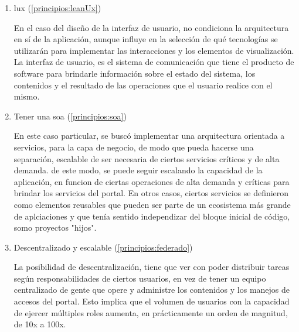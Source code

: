 \begin{enumerate}
    \begin{itemize}
        \item [Loadbalancer de F5]
        \item [Webserver: Apache]
        \item [Application server: Tomcat]
        \item [RDBMS: Oracle]
        \item [sistema operativo de servers: RH Linux]
    \end{itemize}
    
    \item \Gls{lux} (\ref{principios:leanUx})

    En el caso del diseño de la interfaz de usuario, no condiciona la arquitectura en sí de la aplicación, aunque influye en la selección de qué tecnologías se utilizarán para implementar las interacciones y los elementos de visualización. La interfaz de usuario, es el sistema de comunicación que tiene el producto de software para brindarle información sobre el estado del sistema, los contenidos y el resultado de las operaciones que el usuario realice con el mismo. 
    
    \item Tener una \gls{soa} (\ref{principios:soa})

    En este caso particular, se buscó implementar una arquitectura orientada a servicios, para la capa de negocio, de modo que pueda hacerse una separación, escalable de ser necesaria de ciertos servicios críticos y de alta demanda. de este modo, se puede seguir escalando la capacidad de la aplicación, en funcion de ciertas operaciones de alta demanda y críticas para brindar los servicios del portal. En otros casos, ciertos servicios se definieron como elementos reusables que pueden ser parte de un ecosistema más grande de aplciaciones y que tenía sentido independizar del bloque inicial de código, somo proyectos "hijos".
    
    \item Descentralizado y escalable (\ref{principios:federado})
    
    La posibilidad de descentralización, tiene que ver con poder distribuir tareas según responsabilidades de ciertos usuarios, en vez de tener un equipo centralizado de gente que opere y administre los contenidos y los manejos de accesos del portal. Esto implica que el volumen de usuarios con la capacidad de ejercer múltiples roles aumenta, en prácticamente un orden de magnitud, de 10x a 100x.
    

\end{enumerate}
